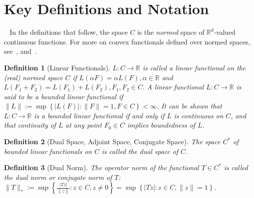 \documentclass[11pt,leqno]{amsart}
\newtheorem{definition}{Definition}
\begin{document}
\section{Key Definitions and Notation}~\label{sec:def}
In the definitions that follow, the space $C$ is the \emph{normed} space of $\mathbb{R}^d$-valued continuous functions. For more on convex functionals defined over normed spaces, see~\cite{1997lue}, and~\cite{2006nicper}. %

\begin{definition}[Linear Functionals] $L: C \to \mathbb{R}$ is called a linear functional on the (real) normed space $C$  if $L(\alpha F) = \alpha L(F), \alpha \in \mathbb{R}$ and $L(F_1 + F_2) = L(F_1) + L(F_2), F_1, F_2 \in C.$ A linear functional $L:C \to \mathbb{R}$ is said to be a \emph{bounded linear functional} if $\|L\| := \sup\left\{|L(F)|: \|F\|=1, F \in C\right\} < \infty.$ It can be shown that $L: C \to \mathbb{R}$ is a bounded linear functional if and only if $L$ is continuous on $C$,  and that continuity of $L$ at any point $F_0 \in C$ implies boundedness of $L$. %
\end{definition}

\begin{definition}[Dual Space, Adjoint Space, Conjugate Space]
The space $C^*$ of \emph{bounded} linear functionals on $C$ is called the \emph{dual space} of $C$. %
\end{definition}

\begin{definition}[Dual Norm] The operator norm of the functional $T \in C^*$ is called the \emph{dual norm} or \emph{conjugate norm} of $T$: $\|T\|_* := \sup\left\{\frac{|Tz|}{\|z\|}: z \in C, z \neq 0\right\} = \sup\left\{|Tz|: z \in C, \|z\| =1\right\}.$
\end{definition}
\end{document}
